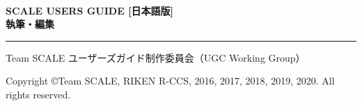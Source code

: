 \newpage
\thispagestyle{empty}

　\\

\vspace{10mm}
{\large{\bf SCALE USERS GUIDE [日本語版]}}\\


\vspace{10mm}
{\large{\bf 執筆・編集}}\\
\hrule width 90mm
\begin{tabbing}
Team SCALE ユーザーズガイド制作委員会（UGC Working Group）%
\end{tabbing}


\vspace{110mm}
\begin{flushright}

\vspace{10mm}
Copyright \copyright Team SCALE, RIKEN R-CCS, 2016, 2017, 2018, 2019, 2020. All rights reserved.
\end{flushright}

